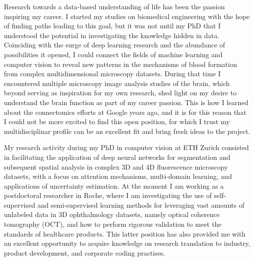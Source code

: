 \documentclass[10pt, letter]{ag-cv} %
\begin{document}
\makecvheader %

\makelettertitlenorec %


\begin{cvletter}






\begin{flushleft}
Research towards a data-based understanding of life has been the passion inspiring my career. I started my studies on biomedical engineering with the hope of finding paths leading to this goal, but it was not until my PhD that I understood the potential in investigating the knowledge hidden in data. Coinciding with the surge of deep learning research and the abundance of possibilities it opened, I could connect the fields of machine learning and computer vision to reveal new patterns in the  mechanisms of blood formation from complex multidimensional microscopy datasets. During that time I encountered multiple microscopy image analysis studies of the brain, which beyond serving as inspiration for my own research, shed light on my desire to understand the brain function as part of my career passion. This is how I learned about the connectomics efforts at Google years ago, and it is for this reason that I could not be more excited to find this open position, for which I trust my multidisciplinar profile can be an excellent fit and bring fresh ideas to the project.  

My research activity during my PhD in computer vision at ETH Zurich consisted in facilitating the application of deep neural networks for segmentation and subsequent spatial analysis in complex 3D and 4D fluorescence microscopy datasets, with a focus on attention mechanisms, multi-domain learning, and applications of uncertainty estimation. At the moment I am working as a postdoctoral researcher in Roche, where I am investigating the use of self-supervised and semi-supervised learning methods for leveraging vast amounts of unlabeled data in 3D ophthalmology datasets, namely optical coherence tomography (OCT), and how to perform rigorous validation to meet the standards of healthcare products. This latter position has also provided me with an excellent opportunity to acquire knowledge on research translation to industry, product development, and corporate coding practises. 


\end{flushleft}
\end{cvletter}
\end{document}
